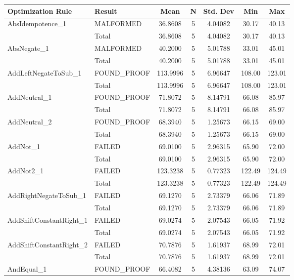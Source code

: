 \begin{appendices}
\begin{longtable}{L{0.25\textwidth} L{0.2\textwidth}  c  c  c  c  c } 
    \toprule
    Optimization Rule & Result & Mean & N & Std. Dev & Min & Max \\ \midrule 
    AbsIdempotence\_1 & MALFORMED & 36.8608 & 5 & 4.04082 & 30.17 & 40.13 \\ \midrule 
    & Total & 36.8608 & 5 & 4.04082 & 30.17 & 40.13 \\ \midrule 
    AbsNegate\_1 & MALFORMED & 40.2000 & 5 & 5.01788 & 33.01 & 45.01 \\ \midrule 
    & Total & 40.2000 & 5 & 5.01788 & 33.01 & 45.01 \\ \midrule 
    AddLeftNegateToSub\_1 & FOUND\_PROOF & 113.9996 & 5 & 6.96647 & 108.00 & 123.01 \\ \midrule 
    & Total & 113.9996 & 5 & 6.96647 & 108.00 & 123.01 \\ \midrule 
    AddNeutral\_1 & FOUND\_PROOF & 71.8072 & 5 & 8.14791 & 66.08 & 85.97 \\ \midrule 
    & Total & 71.8072 & 5 & 8.14791 & 66.08 & 85.97 \\ \midrule 
    AddNeutral\_2 & FOUND\_PROOF & 68.3940 & 5 & 1.25673 & 66.15 & 69.00 \\ \midrule 
    & Total & 68.3940 & 5 & 1.25673 & 66.15 & 69.00 \\ \midrule 
    AddNot\_1 & FAILED & 69.0100 & 5 & 2.96315 & 65.90 & 72.00 \\ \midrule 
    & Total & 69.0100 & 5 & 2.96315 & 65.90 & 72.00 \\ \midrule 
    AddNot2\_1 & FAILED & 123.3238 & 5 & 0.77323 & 122.49 & 124.49 \\ \midrule 
    & Total & 123.3238 & 5 & 0.77323 & 122.49 & 124.49 \\ \midrule 
    AddRightNegateToSub\_1 & FAILED & 69.1270 & 5 & 2.73379 & 66.06 & 71.89 \\ \midrule 
    & Total & 69.1270 & 5 & 2.73379 & 66.06 & 71.89 \\ \midrule 
    AddShiftConstantRight\_1 & FAILED & 69.0274 & 5 & 2.07543 & 66.05 & 71.92 \\ \midrule 
    & Total & 69.0274 & 5 & 2.07543 & 66.05 & 71.92 \\ \midrule 
    AddShiftConstantRight\_2 & FAILED & 70.7876 & 5 & 1.61937 & 68.99 & 72.01 \\ \midrule 
    & Total & 70.7876 & 5 & 1.61937 & 68.99 & 72.01 \\ \midrule 
    AndEqual\_1 & FOUND\_PROOF & 66.4082 & 5 & 4.38136 & 63.09 & 74.07 \\ \midrule 

\end{longtable}
\end{appendices}
